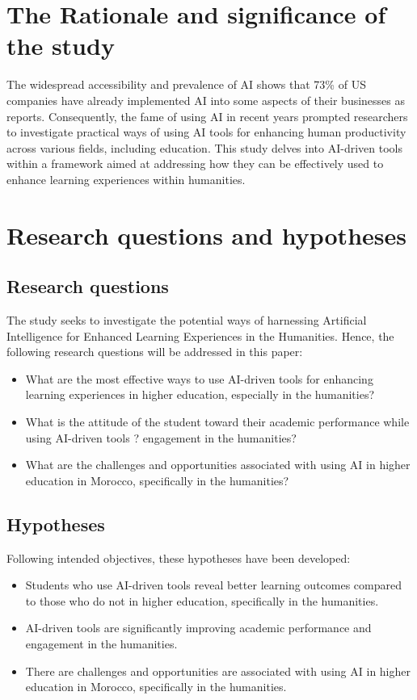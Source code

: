 \section{The Rationale and significance of the study}\label{sec:the-rationale-and-significance-of-the-study}
\justifying
The widespread accessibility and prevalence of AI shows that 73\% of US companies have already
implemented AI into some aspects of their businesses as \textcite{pricewaterhousecoopers} reports.
Consequently, the fame of using AI in recent years prompted researchers to investigate practical
ways of using AI tools for enhancing human productivity across various fields,
including education.
This study delves into AI-driven tools within a framework aimed at addressing
how they can be effectively used to enhance learning experiences within humanities.

\section{Research questions and hypotheses}\label{sec:research-questions-and-hypotheses}
\subsection{Research questions}\label{subsec:research-questions}
\justifying
The study seeks to investigate the potential ways
of harnessing Artificial Intelligence for
Enhanced Learning Experiences in the Humanities.
Hence,
the following research questions will be addressed in this paper:
\begin{itemize}
      \item What are the most effective ways to use AI-driven
            tools for enhancing learning experiences in higher education,
            especially in the humanities?
      \item What is the attitude of the student toward their academic performance
      while using AI-driven tools ?
      engagement in the humanities?
      \item What are the challenges and opportunities associated
            with using AI in higher education in Morocco,
            specifically in the humanities?
\end{itemize}
\subsection{Hypotheses}\label{subsec:hypotheses}
\justifying
\noindent
Following intended objectives, these hypotheses have been developed:
\begin{itemize}
      \item Students who use AI-driven tools reveal better learning outcomes
            compared to those who do not in higher education, specifically in the humanities.
      \item AI-driven tools are significantly improving academic
            performance and engagement in the humanities.
      \item There are challenges and opportunities are associated with using AI in higher
            education in Morocco, specifically in the humanities.
\end{itemize}

